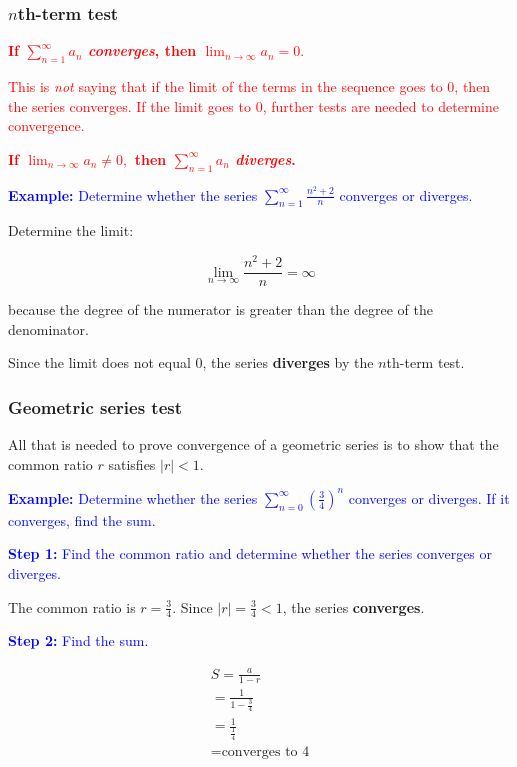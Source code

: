 \documentclass[letterpaper, 12pt]{article}
\newcommand{\example}[1]{\textcolor{blue}{\textbf{Example:} #1}}
\newcommand{\step}[2]{\textcolor{blue}{\textbf{Step #1:} #2}}
\begin{document}
\subsubsection*{$n$th-term test}

\textcolor{red}{\textbf{If $\displaystyle \sum_{n=1}^\infty a_n$ \textit{converges}, then $\displaystyle \lim_{n \to \infty} a_n = 0.$}}

\textcolor{red}{This is \textit{not} saying that if the limit of the terms in the sequence goes to 0, then the series converges. If the limit goes to 0, further tests are needed to determine convergence.}

\textcolor{red}{\textbf{If $\displaystyle \lim_{n \to \infty} a_n \neq 0,$ then $\displaystyle \sum_{n=1}^\infty a_n$ \textit{diverges}.}}

\example{Determine whether the series $\displaystyle \sum_{n=1}^\infty \frac{n^2 + 2}{n}$ converges or diverges.}

Determine the limit:

$$\lim_{n \to \infty} \frac{n^2 + 2}{n} = \infty$$

because the degree of the numerator is greater than the degree of the denominator.

Since the limit does not equal 0, the series \textbf{diverges} by the $n$th-term test.

\subsubsection*{Geometric series test}

All that is needed to prove convergence of a geometric series is to show that the common ratio $r$ satisfies $|r| < 1$.

\example{Determine whether the series $\displaystyle \sum_{n=0}^\infty \left(\frac{3}{4}\right)^n$ converges or diverges. If it converges, find the sum.}

\step{1}{Find the common ratio and determine whether the series converges or diverges.}

The common ratio is $r = \displaystyle \frac{3}{4}$. Since $|r| = \displaystyle \frac{3}{4} < 1$, the series \textbf{converges}.

\step{2}{Find the sum.}

\begin{gather*}
S = \frac{a}{1-r} \\
= \frac{1}{1 - \frac{3}{4}} \\
= \frac{1}{\frac{1}{4}} \\
= \boxed{\text{converges to 4}}
\end{gather*}
\end{document}
